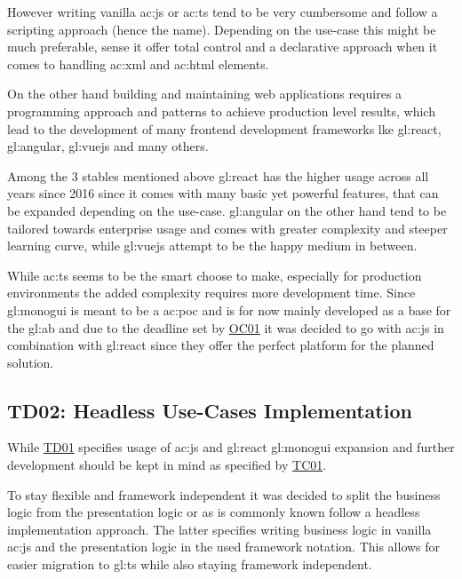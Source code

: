 However writing vanilla \gls{ac:js} or \gls{ac:ts} tend to be very cumbersome and follow a scripting approach (hence the name). Depending on the use-case this might be much preferable, sense it offer total control and a declarative approach when it comes to handling \gls{ac:xml} and \gls{ac:html} elements. 

On the other hand building and maintaining web applications requires a programming approach and patterns to achieve production level results, which lead to the development of many frontend development frameworks lke \gls{gl:react}, \gls{gl:angular}, \gls{gl:vuejs} and many others.

Among the 3 stables mentioned above \gls{gl:react} has the higher usage across all years since 2016 \citep{TheStateOfJs} since it comes with many basic yet powerful features, that can be expanded depending on the use-case. \gls{gl:angular} on the other hand tend to be tailored towards enterprise usage and comes with greater complexity and steeper learning curve, while \gls{gl:vuejs} attempt to be the happy medium in between.


While \gls{ac:ts} seems to be the smart choose to make, especially for production environments the added complexity requires more development time. Since \gls{gl:monogui} is meant to be a \gls{ac:poc} and is for now mainly developed as a base for the \gls{gl:ab} and due to the deadline set by \hyperref[tab:aboc]{OC01} it was decided to go with \gls{ac:js} in combination with \gls{gl:react} since they offer the perfect platform for the planned solution.

\subsection{TD02: Headless Use-Cases Implementation}

While \hyperref[abtd:01]{TD01} specifies usage of \gls{ac:js} and \gls{gl:react} \gls{gl:monogui} expansion and further development should be kept in mind as specified by \hyperref[tab:abtc]{TC01}. 

To stay flexible and framework independent it was decided to split the business logic from the presentation logic or as is commonly known follow a headless implementation approach. The latter specifies writing business logic in vanilla \gls{ac:js} and the presentation logic in the used framework notation. This allows for easier migration to \gls{gl:ts} while also staying framework independent. 

